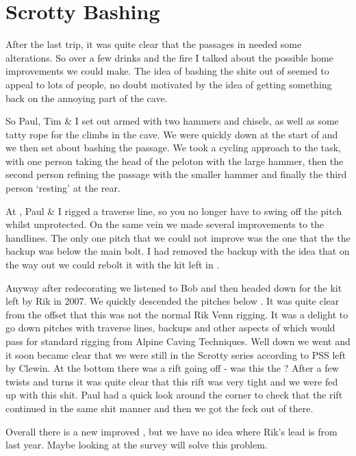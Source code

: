 \section{Scrotty Bashing}


After the last trip, it was quite clear that the passages in
 needed some alterations. So over a few drinks
and the fire I talked about the possible home improvements we could
make. The idea of bashing the shite out of  seemed to appeal to
lots of people, no doubt motivated by the idea of getting something back
on the annoying part of the cave.

So Paul, Tim \& I set out armed with two hammers and chisels, as well as
some tatty rope for the climbs in the cave. We were quickly down at the
start of  and we then set about bashing the
passage. We took a cycling approach to the task, with one person taking
the head of the peloton with the large hammer, then the second person
refining the passage with the smaller hammer and finally the third
person `resting' at the rear.

At , Paul \& I rigged a traverse line, so you no longer
have to swing off the pitch whilst unprotected. On the same vein we made
several improvements to the handlines. The only one pitch that we could
not improve was the one that the the backup was below the main bolt. I
had removed the backup with the idea that on the way out we could rebolt
it with the kit left in .

Anyway after redecorating  we listened to Bob and then headed
down for the kit left by Rik in 2007. We quickly descended the pitches
below . It was quite clear from the offset that
this was not the normal Rik Venn rigging. It was a delight to go down
pitches with traverse lines, backups and other aspects of which would
pass for standard rigging from Alpine Caving Techniques. Well down we
went and it soon became clear that we were still in the Scrotty series
according to PSS left by Clewin. At the bottom there was a rift going
off - was this the ? After a few twists and turns it
was quite clear that this rift was very tight and we were fed up with
this shit. Paul had a quick look around the corner to check that the
rift continued in the same shit manner and then we got the feck out of
there.

Overall there is a new improved , but we have no idea where Rik's
lead is from last year. Maybe looking at the survey will solve this
problem.

